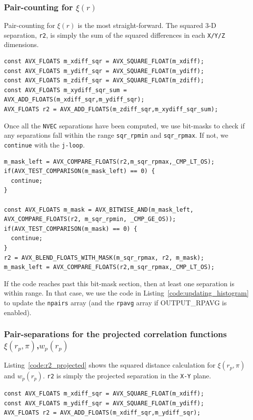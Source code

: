 \documentclass[12pt,titlepage]{article}
\newcommand{\xir}{\ensuremath{{\xi(r)}}\xspace}
\newcommand{\wprp}{\ensuremath{{w_p(r_p)}}\xspace}
\newcommand{\xirppi}{\ensuremath{{\xi(r_p,\pi)}}\xspace}
\begin{document}
\subsubsection{Pair-counting for \texorpdfstring{\xir}{xi(r)}}\label{section:pair_counting_r}
Pair-counting for \xir is the most straight-forward. The squared 3-D separation, \texttt{r2}, is simply the sum of the squared differences in 
each \texttt{X/Y/Z} dimensions. 
\begin{lstlisting}[label={code:r2_xi},caption={Calculating squared separations in \xir.}]
const AVX_FLOATS m_xdiff_sqr = AVX_SQUARE_FLOAT(m_xdiff);
const AVX_FLOATS m_ydiff_sqr = AVX_SQUARE_FLOAT(m_ydiff);
const AVX_FLOATS m_zdiff_sqr = AVX_SQUARE_FLOAT(m_zdiff);
const AVX_FLOATS m_xydiff_sqr_sum = AVX_ADD_FLOATS(m_xdiff_sqr,m_ydiff_sqr);
AVX_FLOATS r2 = AVX_ADD_FLOATS(m_zdiff_sqr,m_xydiff_sqr_sum);
\end{lstlisting}
Once all the \texttt{NVEC} separations have been computed, we use bit-masks to check if any separations fall 
within the range \texttt{sqr\_rpmin} and \texttt{sqr\_rpmax}. If not, we \texttt{continue} with the \texttt{j-loop}. 
\begin{lstlisting}[label={code:masks_xi},caption={Bit-masks in \xir.}]
m_mask_left = AVX_COMPARE_FLOATS(r2,m_sqr_rpmax,_CMP_LT_OS);
if(AVX_TEST_COMPARISON(m_mask_left) == 0) {
  continue;
}

const AVX_FLOATS m_mask = AVX_BITWISE_AND(m_mask_left, AVX_COMPARE_FLOATS(r2, m_sqr_rpmin, _CMP_GE_OS));
if(AVX_TEST_COMPARISON(m_mask) == 0) {
  continue;
}
r2 = AVX_BLEND_FLOATS_WITH_MASK(m_sqr_rpmax, r2, m_mask);
m_mask_left = AVX_COMPARE_FLOATS(r2,m_sqr_rpmax,_CMP_LT_OS);
\end{lstlisting}
If the code reaches past this bit-mask section, then at least one separation is within range. In that case, we use the 
code in Listing~\ref{code:updating_histogram} to update the \texttt{npairs} array (and the \texttt{rpavg} array if 
OUTPUT\_RPAVG is enabled). 

\subsubsection{Pair-separations for the projected correlation functions \texorpdfstring{\xirppi,\wprp}{xi(rp,pi), wp(rp)}}
Listing~\ref{code:r2_projected} shows the squared distance calculation for \xirppi and \wprp. \texttt{r2} is simply 
the projected separation in the \texttt{X-Y} plane.
\begin{lstlisting}[label={code:r2_projected},caption={Calculating squared separations in \xirppi and \wprp.}]
const AVX_FLOATS m_xdiff_sqr = AVX_SQUARE_FLOAT(m_xdiff);
const AVX_FLOATS m_ydiff_sqr = AVX_SQUARE_FLOAT(m_ydiff);
AVX_FLOATS r2 = AVX_ADD_FLOATS(m_xdiff_sqr,m_ydiff_sqr);
\end{lstlisting}
\end{document}
